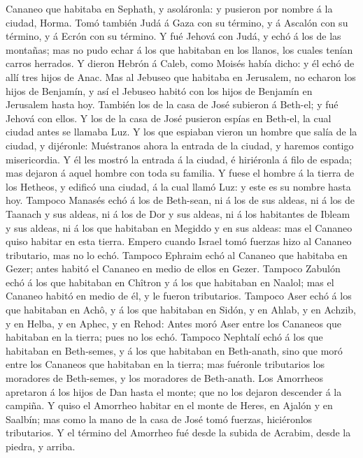 Cananeo que habitaba en Sephath, y asoláronla: y pusieron por nombre á
la ciudad, Horma.  Tomó también Judá á Gaza con su término,
y á Ascalón con su término, y á Ecrón con su término.  Y
fué Jehová con Judá, y echó á los de las montañas; mas no pudo echar á
los que habitaban en los llanos, los cuales tenían carros herrados.
 Y dieron Hebrón á Caleb, como Moisés había dicho: y él
echó de allí tres hijos de Anac.  Mas al Jebuseo que
habitaba en Jerusalem, no echaron los hijos de Benjamín, y así el
Jebuseo habitó con los hijos de Benjamín en Jerusalem hasta hoy.
 También los de la casa de José subieron á Beth-el; y fué
Jehová con ellos.  Y los de la casa de José pusieron espías
en Beth-el, la cual ciudad antes se llamaba Luz.  Y los que
espiaban vieron un hombre que salía de la ciudad, y dijéronle:
Muéstranos ahora la entrada de la ciudad, y haremos contigo
misericordia.  Y él les mostró la entrada á la ciudad, é
hiriéronla á filo de espada; mas dejaron á aquel hombre con toda su
familia.  Y fuese el hombre á la tierra de los Hetheos, y
edificó una ciudad, á la cual llamó Luz: y este es su nombre hasta hoy.
 Tampoco Manasés echó á los de Beth-sean, ni á los de sus
aldeas, ni á los de Taanach y sus aldeas, ni á los de Dor y sus aldeas,
ni á los habitantes de Ibleam y sus aldeas, ni á los que habitaban en
Megiddo y en sus aldeas: mas el Cananeo quiso habitar en esta tierra.
 Empero cuando Israel tomó fuerzas hizo al Cananeo
tributario, mas no lo echó.  Tampoco Ephraim echó al
Cananeo que habitaba en Gezer; antes habitó el Cananeo en medio de ellos
en Gezer.  Tampoco Zabulón echó á los que habitaban en
Chîtron y á los que habitaban en Naalol; mas el Cananeo habitó en medio
de él, y le fueron tributarios.  Tampoco Aser echó á los
que habitaban en Achô, y á los que habitaban en Sidón, y en Ahlab, y en
Achzib, y en Helba, y en Aphec, y en Rehod:  Antes moró
Aser entre los Cananeos que habitaban en la tierra; pues no los echó.
 Tampoco Nephtalí echó á los que habitaban en Beth-semes, y
á los que habitaban en Beth-anath, sino que moró entre los Cananeos que
habitaban en la tierra; mas fuéronle tributarios los moradores de
Beth-semes, y los moradores de Beth-anath.  Los Amorrheos
apretaron á los hijos de Dan hasta el monte; que no los dejaron
descender á la campiña.  Y quiso el Amorrheo habitar en el
monte de Heres, en Ajalón y en Saalbín; mas como la mano de la casa de
José tomó fuerzas, hiciéronlos tributarios.  Y el término
del Amorrheo fué desde la subida de Acrabim, desde la piedra, y arriba.

